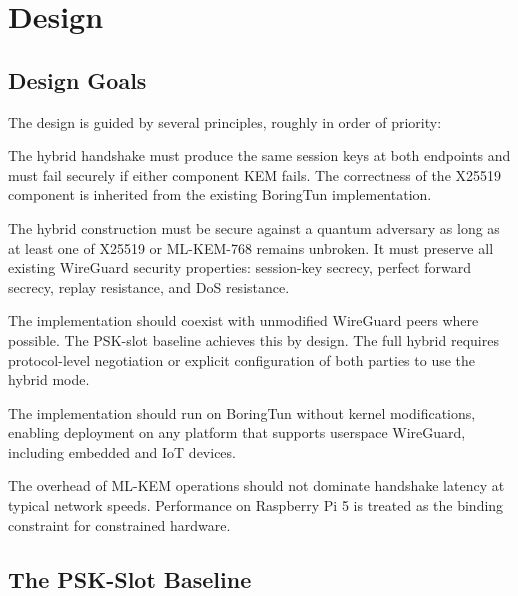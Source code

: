 \chapter{Design}
\label{chap:design}

\section{Design Goals}

The design is guided by several principles, roughly in order of priority:

\begin{description}[style=nextline, leftmargin=0pt]
    \item[Correctness] The hybrid handshake must produce the same session keys at both endpoints and must fail securely if either component KEM fails. The correctness of the X25519 component is inherited from the existing BoringTun implementation.
    
    \item[Security] The hybrid construction must be secure against a quantum adversary as long as at least one of X25519 or ML-KEM-768 remains unbroken. It must preserve all existing WireGuard security properties: session-key secrecy, perfect forward secrecy, replay resistance, and DoS resistance.
    
    \item[Compatibility] The implementation should coexist with unmodified WireGuard peers where possible. The PSK-slot baseline achieves this by design. The full hybrid requires protocol-level negotiation or explicit configuration of both parties to use the hybrid mode.
    
    \item[Deployability] The implementation should run on BoringTun without kernel modifications, enabling deployment on any platform that supports userspace WireGuard, including embedded and IoT devices.
    
    \item[Performance] The overhead of ML-KEM operations should not dominate handshake latency at typical network speeds. Performance on Raspberry Pi 5 is treated as the binding constraint for constrained hardware.
\end{description}

\section{The PSK-Slot Baseline}

